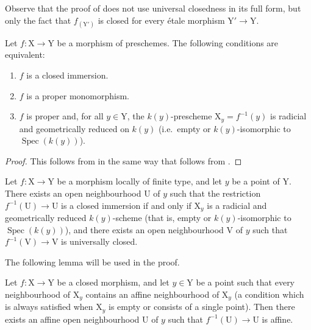 \begin{remark}[18.12.5]
\label{IV.18.12.5}
Observe that the proof of  does not use universal closedness in its full form, but only the fact that $f_{(\mathrm{Y}')}$ is closed for every \'etale morphism $\mathrm{Y}'\to\mathrm{Y}$.
\end{remark}

\begin{corollary}[18.12.6]
\label{IV.18.12.6}
Let $f:\mathrm{X}\to\mathrm{Y}$ be a morphism of preschemes.
The following conditions are equivalent:
\begin{enumerate}[label=\alph*)]
  \item $f$ is a closed immersion.
  \item $f$ is a proper monomorphism.
  \item $f$ is proper and, for all $y\in\mathrm{Y}$, the $k(y)$-prescheme $\mathrm{X}_y=f^{-1}(y)$ is radicial and geometrically reduced on $k(y)$ (i.e.\ empty or $k(y)$-isomorphic to $\operatorname{Spec}(k(y))$).
\end{enumerate}
\end{corollary}

\begin{proof}
This follows from  in the same way that  follows from .
\end{proof}

\begin{proposition}[18.12.7]
\label{IV.18.12.7}
Let $f:\mathrm{X}\to\mathrm{Y}$ be a morphism locally of finite type, and let $y$ be a point of $\mathrm{Y}$.
There exists an open neighbourhood $\mathrm{U}$ of $y$ such that the restriction $f^{-1}(\mathrm{U})\to\mathrm{U}$ is a closed immersion if and only if $\mathrm{X}_y$ is a radicial and geometrically reduced $k(y)$-scheme (that is, empty or $k(y)$-isomorphic to $\operatorname{Spec}(k(y))$), and there exists an open neighbourhood $\mathrm{V}$ of $y$ such that $f^{-1}(\mathrm{V})\to\mathrm{V}$ is universally closed.
\end{proposition}

The following lemma will be used in the proof.

\begin{lemma}[18.12.7.1]
\label{IV.18.12.7.1}
Let $f:\mathrm{X}\to\mathrm{Y}$ be a closed morphism, and let $y\in\mathrm{Y}$ be a point such that every neighbourhood of $\mathrm{X}_y$ contains an affine neighbourhood of $\mathrm{X}_y$ (a condition which is always satisfied when $\mathrm{X}_y$ is empty or consists of a single point).
Then there exists an affine open neighbourhood $\mathrm{U}$ of $y$ such that $f^{-1}(\mathrm{U})\to\mathrm{U}$ is affine.
\end{lemma}

